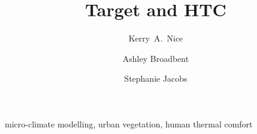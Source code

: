 \documentclass[final,3p,times,authoryear]{elsarticle}
\begin{document}
\begin{frontmatter}



\title{Target and HTC}




\author[melb,monash,crc]{Kerry~A.~Nice}
\author[az1,az2,monash,crc]{Ashley Broadbent}
\author[monash,crc]{Stephanie Jacobs}


\address[melb]{Transport, Health, and Urban Design Hub, Faculty of Architecture, Building, and Planning, University of Melbourne, Victoria 3010, Australia}
\address[monash]{School of Earth, Atmosphere and Environment, Monash University, Clayton, VIC 3800, Australia}
\address[az1]{School of Geographical Sciences and Urban Planning, Arizona State University, Tempe, Arizona, USA}
\address[az2]{Urban Climate Research Center, Arizona State University, Tempe, Arizona, USA}
\address[crc]{Cooperative Research Centre for Water Sensitive Cities, Melbourne, Australia}





\begin{abstract}



\end{abstract}

\begin{keyword}
micro-climate modelling, urban vegetation, human thermal comfort



\end{keyword}

\end{frontmatter}
\end{document}
